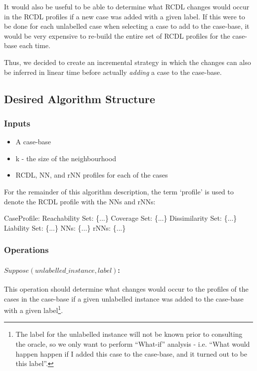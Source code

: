 \documentclass[a4paper,11pt]{report}
\begin{document}
It would also be useful to be able to determine what RCDL changes would occur in the RCDL profiles if a new case was added with a given label. If this were to be done for each unlabelled case when selecting a case to add to the case-base, it would be very expensive to re-build the entire set of RCDL profiles for the case-base each time.

Thus, we decided to create an incremental strategy in which the changes can also be inferred in linear time before actually \emph{adding} a case to the case-base.

\subsection{Desired Algorithm Structure}
\subsubsection{Inputs}
\begin{itemize}
	\item A case-base 
	\item k - the size of the neighbourhood
	\item RCDL, NN, and rNN profiles for each of the cases
\end{itemize}

\begin{samepage}
For the remainder of this algorithm description, the term `profile' is used to denote the RCDL profile with the NNs and rNNs:
\nopagebreak[4]
\begin{code}[numbers=none,frame=none]
CaseProfile:  
  Reachability Set:  \{...\}
  Coverage Set:      \{...\}
  Dissimilarity Set: \{...\}
  Liability Set:     \{...\}
  NNs:               \{...\}
  rNNs:              \{...\}
\end{code}
\end{samepage}
\subsubsection{Operations\label{sec:incralgstructops}}
\paragraph{$Suppose(unlabelled\_instance, label)$:}
This operation should determine what changes would occur to the profiles of the cases in the case-base if a given unlabelled instance was added to the case-base with a given label\footnote{The label for the unlabelled instance will not be known prior to consulting the oracle, so we only want to perform ``What-if'' analysis - i.e. ``What would happen happen if I added this case to the case-base, and it turned out to be this label''.}.
\end{document}
